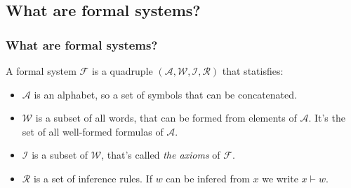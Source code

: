 \subsection{What are formal systems?}
\begin{frame}
  \frametitle{What are formal systems?}
  \begin{definition}
    A formal system $\mathcal{F}$ is a quadruple $(\mathcal{A}, \mathcal{W}, \mathcal{I}, \mathcal{R})$ that statisfies:
    \begin{itemize}
        \pause \item $\mathcal{A}$ is an alphabet, so a set of symbols that can be concatenated.
        \pause \item $\mathcal{W}$ is a subset of all words, that can be formed from elements of $\mathcal{A}$. It's the set of all well-formed formulas of $\mathcal{A}$.
        \pause \item $\mathcal{I}$ is a subset of $\mathcal{W}$, that's called \emph{the axioms} of $\mathcal{F}$.
        \pause \item $\mathcal{R}$ is a set of inference rules. If $w$ can be infered from $x$ we write $x \vdash w$.
    \end{itemize}
  \end{definition}
\end{frame}


